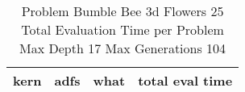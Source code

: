 \begin{table}[H]
\caption{Problem  Bumble Bee 3d  Flowers 25\\Total Evaluation Time per Problem \\ Max Depth 17 Max Generations 104\\}
\begin{center}
\scalebox{1.0} %
{
\begin{tabular}{lllr}
\hline
kern & adfs & what & total eval time \\
\hline


\end{tabular}
}
\end{center}
\end{table}

